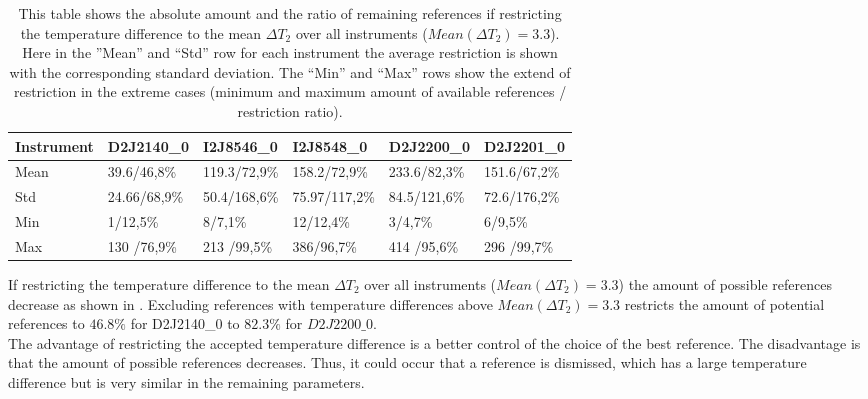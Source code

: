 \begin{table}
	\begin{tabular}{|p{2cm}|p{2cm}|p{2cm}|p{2cm}|p{2cm}|p{2cm}|}
		Instrument	&D2J2140\_0&I2J8546\_0& I2J8548\_0&D2J2200\_0&D2J2201\_0\\
		\toprule
		Mean&
		39.6/46,8\%&
		119.3/72,9\%
		&158.2/72,9\%
		&233.6/82,3\%
		&151.6/67,2\%\\
		\midrule
		Std&
		24.66/68,9\%&
		50.4/168,6\%&
		75.97/117,2\%&
		84.5/121,6\%&
		72.6/176,2\%\\
		\midrule
		Min&
		1/12,5\%
		&8/7,1\%&
		12/12,4\%&
		3/4,7\% &
		6/9,5\%\\
		\midrule
		Max
		&
		130	/76,9\%&
		213	/99,5\%&
		386/96,7\%&
		414	/95,6\% &
		296	/99,7\%\\
		\bottomrule
	\end{tabular}
	\caption{This table shows the absolute amount and the ratio of remaining references if restricting the temperature difference to the mean $\Delta T_{2}$ over all instruments ($Mean(\Delta T_{2}) = 3.3$). Here in the ”Mean” and “Std” row for each  instrument the average restriction is shown with the corresponding standard deviation. The “Min” and “Max” rows show the extend of restriction in the extreme cases (minimum and maximum amount of available references / restriction ratio).}
	\label{tab:decTemp}
\end{table}	
If restricting the temperature difference to the mean $\Delta T_{2}$ over all instruments ($Mean(\Delta T_{2}) = 3.3$) the amount of possible references decrease as shown in . Excluding references with temperature differences above $Mean(\Delta T_{2}) = 3.3$ restricts the amount of potential references to $46.8\%$ for D2J2140\_0 to $82.3\%$ for $D2J2200\_0$.\\
The advantage of restricting the accepted temperature difference is a better control of the choice of the best reference. The disadvantage is that the amount of possible references decreases. Thus, it could occur that a reference is dismissed, which has a large temperature difference but is very similar in the remaining parameters.\\


